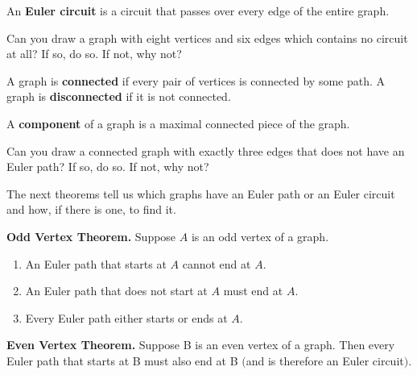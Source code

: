 \begin{dfn}
An \textbf{Euler circuit} is a circuit that passes over every edge of the entire graph.
\end{dfn}

\begin{prb}
Can you draw a graph with eight vertices and six edges which contains no circuit at all? If so, do so.  If not, why not?
\end{prb}

\begin{dfn}
\label{connecteddfn}
A graph is \textbf{connected} if every pair of vertices is connected by some path.  A graph is \textbf{disconnected} if it is not connected.
\end{dfn}

\begin{dfn}
A \textbf{component} of a graph is a maximal connected piece of the graph.
\end{dfn}

\begin{prb}
Can you draw a connected graph with exactly three edges that does not have an Euler path? If so, do so.  If not, why not?
\end{prb}

The next theorems tell us which graphs have an Euler path or an Euler circuit and how, if there is one, to find it.
\begin{annotation}
\end{annotation}

\begin{thm}
\textbf{Odd Vertex Theorem.} Suppose  $A$  is an odd vertex of a graph.
\begin{enumerate}
  \item An Euler path that starts at  $A$  cannot end at  $A$.
  \item An Euler path that does not start at  $A$  must end at  $A$.
  \item Every Euler path either starts or ends at  $A$.
\end{enumerate}
\end{thm}

\begin{thm}
\textbf{Even Vertex Theorem.} Suppose  B  is an even vertex of a graph.  Then every Euler path that starts at  B  must also end at  B $($and is therefore an Euler circuit$)$.
\end{thm}

